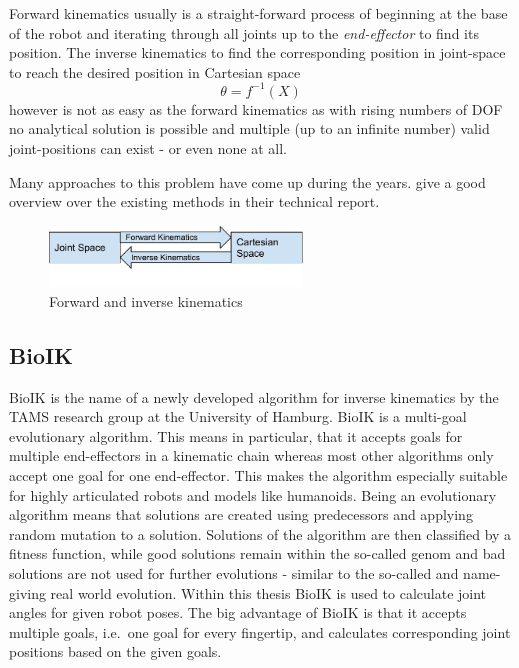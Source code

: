 Forward kinematics usually is a straight-forward process of beginning at the base of the robot and iterating through all joints up to the \textit{end-effector} to find its position. The inverse kinematics to find the corresponding position in joint-space to reach the desired position in Cartesian space
\begin{equation*}
\theta = f^{-1}(X)
\end{equation*}
however is not as easy as the forward kinematics as with rising numbers of DOF no analytical solution is possible and multiple (up to an infinite number) valid joint-positions can exist - or even none at all\cite{DextquotesingleSouza}.

Many approaches to this problem have come up during the years. \citeauthor{andreasaristidou2009inverse} give a good overview over the existing methods in their technical report\cite{DextquotesingleSouza}.

\begin{figure}
	\caption{Forward and inverse kinematics\label{fig:basics:kinematics}}
	\begin{center}
		\includegraphics[width=0.6\textwidth]{assets/chpt_basics/Kinematics.pdf}
	\end{center}
\end{figure}

\subsection{BioIK}
\label{sec:bioik}
BioIK is the name of a newly developed algorithm for inverse kinematics by the TAMS research group at the University of Hamburg\cite{Starke2017}. BioIK is a multi-goal evolutionary algorithm. This means in particular, that it accepts goals for multiple end-effectors in a kinematic chain whereas most other algorithms only accept one goal for one end-effector. This makes the algorithm especially suitable for highly articulated robots and models like humanoids\cite{Starkea2017}. Being an evolutionary algorithm means that solutions are created using predecessors and applying random mutation to a solution. Solutions of the algorithm are then classified by a fitness function, while good solutions remain within the so-called genom and bad solutions are not used for further evolutions\cite{Ruppel17} - similar to the so-called and name-giving real world evolution. Within this thesis BioIK is used to calculate joint angles for given robot poses. The big advantage of BioIK is that it accepts multiple goals, i.e.~one goal for every fingertip, and calculates corresponding joint positions based on the given goals.

